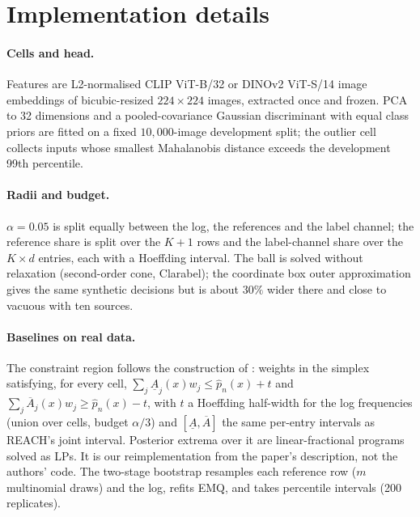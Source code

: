 \documentclass[twoside]{article}
\begin{document}
\section{Implementation details}
\label{app:details}

\paragraph{Cells and head.} Features are L2-normalised CLIP ViT-B/32 or DINOv2 ViT-S/14 image
embeddings of bicubic-resized $224\times224$ images, extracted once and frozen. PCA to 32 dimensions
and a pooled-covariance Gaussian discriminant with equal class priors are fitted on a fixed
$10{,}000$-image development split; the outlier cell collects inputs whose smallest Mahalanobis
distance exceeds the development 99th percentile.

\paragraph{Radii and budget.} $\alpha=0.05$ is split equally between the log, the references and the
label channel; the reference share is split over the $K+1$ rows and the label-channel share over the
$K\times d$ entries, each with a Hoeffding interval. The ball is solved without relaxation (second-order cone,
Clarabel); the coordinate box outer approximation gives the same synthetic decisions but is about
$30\%$ wider there and close to vacuous with ten sources.

\paragraph{Baselines on real data.} The constraint region follows the construction of
\citet{li2026matrix}: weights in the simplex satisfying, for every cell, $\sum_j\underline A_j(x)w_j\le\hat
p_n(x)+t$ and $\sum_j\overline A_j(x)w_j\ge\hat p_n(x)-t$, with $t$ a Hoeffding half-width for the log
frequencies (union over cells, budget $\alpha/3$) and $[\underline A,\overline A]$ the same per-entry intervals
as REACH's joint interval. Posterior extrema over it are linear-fractional programs solved as LPs. It
is our reimplementation from the paper's description, not the authors' code. The two-stage bootstrap
resamples each reference row ($m$ multinomial draws) and the log, refits EMQ, and takes percentile
intervals (200 replicates).
\end{document}
